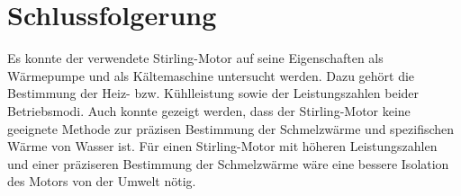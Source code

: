 \documentclass[
	a4paper,
	12pt,
	pagesize,
	ngerman
]{scrartcl}
\begin{document}
	\section{Schlussfolgerung}
	Es konnte der verwendete Stirling-Motor auf seine Eigenschaften als Wärmepumpe und als Kältemaschine untersucht werden.
	Dazu gehört die Bestimmung der Heiz- bzw. Kühlleistung sowie der Leistungszahlen beider Betriebsmodi.
	Auch konnte gezeigt werden, dass der Stirling-Motor keine geeignete Methode zur präzisen Bestimmung der Schmelzwärme und spezifischen Wärme von Wasser ist.
	Für einen Stirling-Motor mit höheren Leistungszahlen und einer präziseren Bestimmung der Schmelzwärme wäre eine bessere Isolation des Motors von der Umwelt nötig.
	\printbibliography
\end{document}
